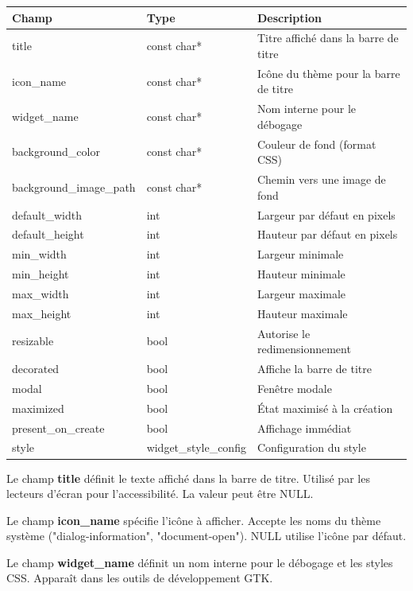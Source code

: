 \begin{center}
\begin{tabular}{|l|l|>{\raggedright\arraybackslash}p{6cm}|}
\hline
\textbf{Champ} & \textbf{Type} & \textbf{Description} \\
\hline
title & const char* & Titre affiché dans la barre de titre \\
\hline
icon\_name & const char* & Icône du thème pour la barre de titre \\
\hline
widget\_name & const char* & Nom interne pour le débogage \\
\hline
background\_color & const char* & Couleur de fond (format CSS) \\
\hline
background\_image\_path & const char* & Chemin vers une image de fond \\
\hline
default\_width & int & Largeur par défaut en pixels \\
\hline
default\_height & int & Hauteur par défaut en pixels \\
\hline
min\_width & int & Largeur minimale \\
\hline
min\_height & int & Hauteur minimale \\
\hline
max\_width & int & Largeur maximale \\
\hline
max\_height & int & Hauteur maximale \\
\hline
resizable & bool & Autorise le redimensionnement \\
\hline
decorated & bool & Affiche la barre de titre \\
\hline
modal & bool & Fenêtre modale \\
\hline
maximized & bool & État maximisé à la création \\
\hline
present\_on\_create & bool & Affichage immédiat \\
\hline
style & widget\_style\_config & Configuration du style \\
\hline
\end{tabular}
\end{center}

\bigskip

Le champ \textbf{title} définit le texte affiché dans la barre de titre. Utilisé par les lecteurs d'écran pour l'accessibilité. La valeur peut être NULL.

Le champ \textbf{icon\_name} spécifie l'icône à afficher. Accepte les noms du thème système ("dialog-information", "document-open"). NULL utilise l'icône par défaut.

Le champ \textbf{widget\_name} définit un nom interne pour le débogage et les styles CSS. Apparaît dans les outils de développement GTK.

